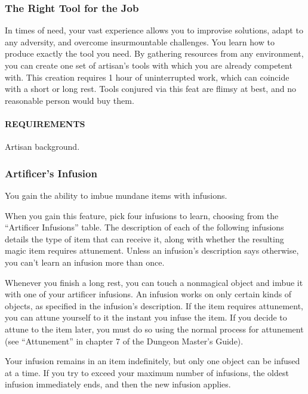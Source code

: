     \subsubsection{The Right Tool for the Job} \label{feat::therighttoolforthejob}
        In times of need, your vast experience allows you to improvise solutions, adapt to any adversity, and overcome insurmountable challenges.
        You learn how to produce exactly the tool you need.
        By gathering resources from any environment, you can create one set of artisan's tools with which you are already competent with.
        This creation requires 1 hour of uninterrupted work, which can coincide with a short or long rest.
        Tools conjured via this feat are flimsy at best, and no reasonable person would buy them.
        \paragraph{REQUIREMENTS} Artisan background.

    \subsubsection{Artificer's Infusion} \label{feat::artificersinfusion}
        You gain the ability to imbue mundane items with infusions.

        When you gain this feature, pick four infusions to learn, choosing from the ``Artificer Infusions'' table.
        The description of each of the following infusions details the type of item that can receive it, along with whether the resulting magic item requires attunement.
        Unless an infusion's description says otherwise, you can't learn an infusion more than once.

        Whenever you finish a long rest, you can touch a nonmagical object and imbue it with one of your artificer infusions.
        An infusion works on only certain kinds of objects, as specified in the infusion's description.
        If the item requires attunement, you can attune yourself to it the instant you infuse the item.
        If you decide to attune to the item later, you must do so using the normal process for attunement (see ``Attunement'' in chapter 7 of the Dungeon Master's Guide).

        Your infusion remains in an item indefinitely, but only one object can be infused at a time.
        If you try to exceed your maximum number of infusions, the oldest infusion immediately ends, and then the new infusion applies.

